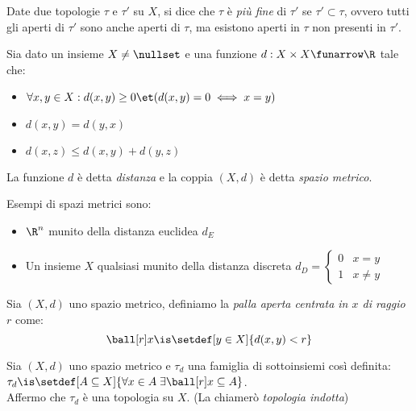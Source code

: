 \begin{defn}
Date due topologie $\tau$ e $\tau'$ su $X$, si dice che $\tau$ è \emph{più fine} di $\tau'$ se $\tau'\subset\tau$, ovvero tutti gli aperti di $\tau'$ sono anche aperti di $\tau$, ma esistono aperti in $\tau$ non presenti in $\tau'$.
\end{defn}


\begin{defn}
Sia dato un insieme $X\neq\nullset$ e una funzione $d: X \times X \funarrow \R$ tale che:
\begin{itemize}
\item $\forall x,y \in X:  d(x,y)\ge0 \et (d(x,y)=0 \iff x=y)$
\item $d(x,y) = d(y,x)$
\item $d(x,z) \le d(x,y) + d(y,z)$
\end{itemize}
La funzione $d$ è detta \emph{distanza} e la coppia $(X,d)$ è detta \emph{spazio metrico}.
\end{defn}

\begin{es}
Esempi di spazi metrici sono:
\begin{itemize}
\item  $\R^n$ munito della distanza euclidea $d_E$
\item Un insieme $X$ qualsiasi munito della distanza discreta $d_D= \begin{cases} 0 & x=y \\ 1 & x \neq y \end{cases}$
\end{itemize}
\end{es}

\begin{defn}
Sia $(X,d)$ uno spazio metrico, definiamo la \emph{palla aperta centrata in $x$ di raggio $r$} come:
\[\ball[r]x \is \setdef[y \in X]{d(x,y) < r}\]
\end{defn}

\begin{prop}
Sia $(X, d)$ uno spazio metrico e $\tau_d$ una famiglia di sottoinsiemi così definita: $\tau_d \is \setdef[A \subseteq  X]{\forall x \in A \;\exists \ball[r]x \subseteq A}$.\\
Affermo che $\tau_d$ è una topologia su $X$. (La chiamerò \textit{topologia indotta})
\end{prop}

